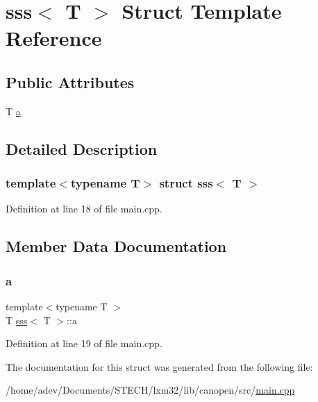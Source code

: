 \hypertarget{structsss}{}\section{sss$<$ T $>$ Struct Template Reference}
\label{structsss}
\subsection*{Public Attributes}
\begin{DoxyCompactItemize}
\item 
T \hyperlink{structsss_a0d82573d6d7582dff0c9bb07e9c672b0}{a}
\end{DoxyCompactItemize}


\subsection{Detailed Description}
\subsubsection*{template$<$typename T$>$\newline
struct sss$<$ T $>$}



Definition at line 18 of file main.\+cpp.



\subsection{Member Data Documentation}
\mbox{\label{structsss_a0d82573d6d7582dff0c9bb07e9c672b0}} 
\subsubsection{\texorpdfstring{a}{a}}
{\footnotesize\ttfamily template$<$typename T $>$ \\
T \hyperlink{structsss}{sss}$<$ T $>$\+::a}



Definition at line 19 of file main.\+cpp.



The documentation for this struct was generated from the following file\+:\begin{DoxyCompactItemize}
\item 
/home/adev/\+Documents/\+S\+T\+E\+C\+H/lxm32/lib/canopen/src/\hyperlink{lib_2canopen_2src_2main_8cpp}{main.\+cpp}\end{DoxyCompactItemize}
